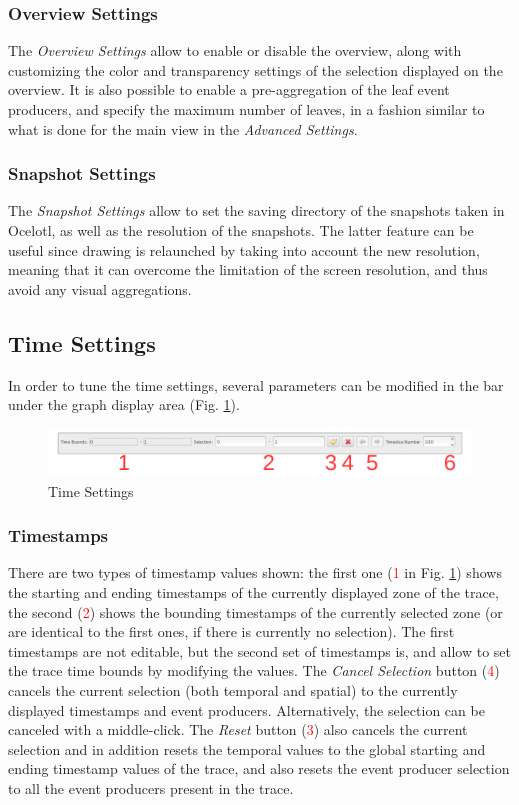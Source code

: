 \documentclass[twoside]{article}
\begin{document}
\begin{sloppypar}
\subsubsection{Overview Settings}
The \textit{Overview Settings} allow to enable or disable the overview, along with customizing the color and transparency settings of the selection displayed on the overview. It is also possible to enable a pre-aggregation of the leaf event producers, and specify the maximum number of leaves, in a fashion similar to what is done for the main view in the \textit{Advanced Settings}.

\subsubsection{Snapshot Settings}
The \textit{Snapshot Settings} allow to set the saving directory of the snapshots taken in Ocelotl, as well as the resolution of the snapshots. The latter feature can be useful since drawing is relaunched by taking into account the new resolution, meaning that it can overcome the limitation of the screen resolution, and thus avoid any visual aggregations.

\subsection{Time Settings}
In order to tune the time settings, several parameters can be modified in the bar under the graph display area (Fig. \ref{timeSettings}).
 
\begin{figure}[h!]
	\centering
	\includegraphics[width=1.0\textwidth]{images/ocelotl_bottom_time.pdf}
	\caption{Time Settings}
	\label{timeSettings}
\end{figure}

\subsubsection{Timestamps}
There are two types of timestamp values shown: the first one (\textcolor{red}{1} in Fig. \ref{timeSettings}) shows the starting and ending timestamps of the currently displayed zone of the trace, the second (\textcolor{red}{2}) shows the bounding timestamps of the currently selected zone (or are identical to the first ones, if there is currently no selection). The first timestamps are not editable, but the second set of timestamps is, and allow to set the trace time bounds by modifying the values. The \textit{Cancel Selection} button (\textcolor{red}{4}) cancels the current selection (both temporal and spatial) to the currently displayed timestamps and event producers. Alternatively, the selection can be canceled with a middle-click. The \textit{Reset} button (\textcolor{red}{3}) also cancels the current selection and in addition resets the temporal values to the global starting and ending timestamp values of the trace, and also resets the event producer selection to all the event producers present in the trace.


\end{sloppypar}
\end{document}
